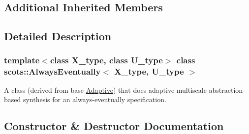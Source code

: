\subsection*{Additional Inherited Members}


\subsection{Detailed Description}
\subsubsection*{template$<$class X\+\_\+type, class U\+\_\+type$>$\newline
class scots\+::\+Always\+Eventually$<$ X\+\_\+type, U\+\_\+type $>$}

A class (derived from base \hyperlink{classscots_1_1Adaptive}{Adaptive}) that does adaptive multiscale abstraction-\/based synthesis for an always-\/eventually specification. 

\subsection{Constructor \& Destructor Documentation}
\mbox{\label{classscots_1_1AlwaysEventually_a9a84a1c19b7ca2d26507247e47d3d95a}} 
